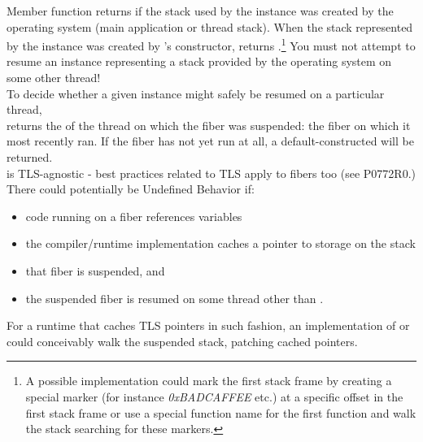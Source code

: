 
Member function \usessysstack returns  if the stack used by the
\fiber instance was created by the operating system (main application or thread
stack). When the stack represented by the \fiber instance was created
by \fiber's constructor, \usessysstack returns .\footnote{A possible
implementation could mark the first stack frame by creating
a special marker (for instance \emph{0xBADCAFFEE} etc.) at a specific offset
in the first stack frame or use a special function name for the first function 
and walk the stack searching for these markers.} You must not
attempt to resume an instance representing a stack
provided by the operating system on some other thread!\\

To decide whether a given \fiber instance might safely be resumed on a
particular thread,\\\prevtid returns the  of the thread on
which the fiber was suspended: the fiber on which it most recently ran. If the
fiber has not yet run at all, a default-constructed  will
be returned.\\

\fiber is TLS-agnostic - best practices related to TLS apply to fibers too
(see P0772R0.)\\

There could potentially be Undefined Behavior if:
\begin{itemize}
    \item code running on a fiber references  variables
    \item the compiler/runtime implementation caches a pointer
          to  storage on the stack
    \item that fiber is suspended, and
    \item the suspended fiber is resumed on some thread other than \prevtid.
\end{itemize}

For a runtime that caches TLS pointers in such fashion, an implementation
of \xtresume or\\
\xtresumewith could conceivably walk the suspended stack,
patching cached pointers.

